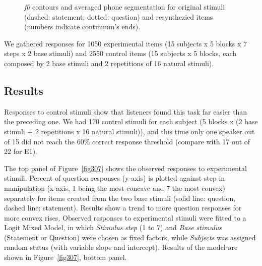 \begin{figure}
\centering
{}
\caption{\textit{f0} contours and averaged phone segmentation for original stimuli (dashed: statement; dotted: question) and resynthezied items (numbers indicate continuum's ends).}
\label{fig306}\end{figure}

We gathered responses for 1050 experimental items (15 subjects x 5 blocks x 7 steps x 2 base stimuli) and 2550 control items (15 subjects x 5 blocks, each composed by 2 base stimuli and 2 repetitions of 16 natural stimuli).

\subsection{Results}\label{sec332}
Responses to control stimuli show that listeners found this task far easier than the preceding one. We had 170 control stimuli for each subject (5 blocks x (2 base stimuli + 2 repetitions x 16 natural stimuli)), and this time only one speaker out of 15 did not reach the 60\% correct response threshold (compare with 17 out of 22 for E1). 

The top panel of Figure~\ref{fig307} shows the observed responses to experimental stimuli. Percent of question responses (y-axis) is plotted against step in manipulation (x-axis, 1 being the most concave and 7 the most convex) separately for items created from the two base stimuli (solid line: question, dashed line: statement). Results show a trend to more question responses for more convex rises. Observed responses to experimental stimuli were fitted to a Logit Mixed Model, in which \textit{Stimulus step} (1 to 7) and \textit{Base stimulus} (Statement or Question) were chosen as fixed factors, while \textit{Subjects} was assigned random status (with variable slope and intercept). Results of the model are shown in Figure~\ref{fig307}, bottom panel.

